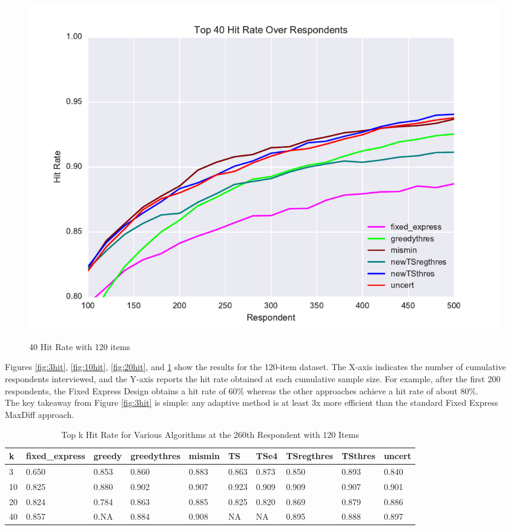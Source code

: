 \documentclass[nonblindrev]{informs3}
\begin{document}
\begin{figure}
\caption{40 Hit Rate with 120 items}
\includegraphics[width=1\textwidth]{plots/hr120v20k40.pdf}
\label{fig:40hit}
\end{figure}
Figures \ref{fig:3hit}, \ref{fig:10hit}, \ref{fig:20hit}, and \ref{fig:40hit} show the results for the 120-item dataset.  The X-axis indicates the number of cumulative respondents interviewed, and the Y-axis reports the hit rate obtained at each cumulative sample size.  For example, after the first 200 respondents, the Fixed Express Design obtains a hit rate of 60\% whereas the other approaches achieve a hit rate of about 80\%.\\
The key takeaway from Figure \ref{fig:3hit} is simple: any adaptive method is at least 3x more efficient than the standard Fixed Express MaxDiff approach.
\begin{table}
\begin{center}
\begin{tabular}{llllllllll}
\hline   k &  fixed\_express &  greedy &  greedythres &  mismin &    TS &  TSe4 &  TSregthres &  TSthres &  uncert \\ \hline  3 &          0.650 &   0.853 &        0.860 &   0.883 & 0.863 & 0.873 &       0.850 &    0.893 &   0.840 \\  10 &          0.825 &   0.880 &        0.902 &   0.907 & 0.923 & 0.909 &       0.909 &    0.907 &   0.901 \\  20 &          0.824 &   0.784 &        0.863 &   0.885 & 0.825 & 0.820 &       0.869 &    0.879 &   0.886 \\  40 &          0.857 &   0.NA &        0.884 &   0.908 & NA & NA &       0.895 &    0.888 &   0.897\end{tabular}
\end{center}
\caption{Top k Hit Rate for Various Algorithms at the 260th Respondent with 120 Items}
\label{table:at260}
\end{table}
\end{document}

